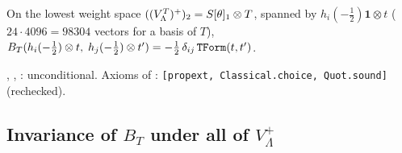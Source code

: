 \begin{example}
On the lowest weight space $((V_{\Lambda}^{T})^{+})_2=S[\theta]_1\otimes T$, spanned by
$h_i(-\frac12)\mathbf1\otimes t$ ($24\cdot4096=98304$ vectors for a basis of $T$),
$B_T(h_i(-\frac12)\otimes t,\;h_j(-\frac12)\otimes t')=-\tfrac12\,\delta_{ij}\,\lean{TForm}(t,t')$.
\end{example}

\begin{status}
, , : unconditional. Axioms
of : \texttt{[propext, Classical.choice, Quot.sound]} (rechecked).
\end{status}

\subsection{Invariance of \texorpdfstring{$B_T$}{B\_T} under all of \texorpdfstring{$V_\Lambda^+$}{V Lambda plus}}

